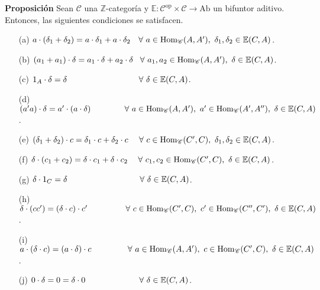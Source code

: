 \documentclass[preview]{standalone}
\begin{document}
\begin{center}
\justifying \textbf{Proposición} Sean $\mathscr{C}$ una $\mathbb{Z}$-categoría y $\mathbb{E}:\mathscr{C}^\text{op}\times\mathscr{C}\to\text{Ab}$ un bifuntor aditivo. Entonces, las siguientes condiciones se satisfacen. \begin{enumerate} \item[(a)] $a\cdot(\delta_1+\delta_2) = a\cdot\delta_1 + a\cdot\delta_2 \hspace{-0.1mm} \quad \forall \ a\in\text{Hom}_\mathscr{C}(A,A'), \ \delta_1,\delta_2\in\mathbb{E}(C,A)$. \item[(b)] $(a_1+a_1)\cdot\delta = a_1\cdot\delta + a_2\cdot\delta \quad \hspace{-0.58mm} \forall \ a_1,a_2\in\text{Hom}_\mathscr{C}(A,A'), \ \delta\in\mathbb{E}(C,A)$. \item[(c)] $1_A\cdot\delta = \delta \hspace{3.06cm} \forall \ \delta\in\mathbb{E}(C,A)$. \item[(d)] $(a'a)\cdot\delta = a'\cdot(a\cdot\delta) \hspace{1.455cm} \forall \ a\in\text{Hom}_\mathscr{C}(A,A'), \ a'\in\text{Hom}_\mathscr{C}(A',A''), \ \delta\in\mathbb{E}(C,A)$. \item[(e)] $(\delta_1+\delta_2)\cdot c = \delta_1\cdot c + \delta_2\cdot c \hspace{4.65mm} \forall \ c\in\text{Hom}_\mathscr{C}(C',C), \ \delta_1,\delta_2\in\mathbb{E}(C,A)$. \item[(f)] $\delta\cdot(c_1+c_2)=\delta\cdot c_1 + \delta\cdot c_2 \hspace{4.425mm} \forall \ c_1,c_2\in\text{Hom}_\mathscr{C}(C',C), \ \delta\in\mathbb{E}(C,A)$. \item[(g)] $\delta\cdot1_C  = \delta \hspace{3.085cm} \forall \ \delta\in\mathbb{E}(C,A)$. \item[(h)] $\delta\cdot(cc') = (\delta\cdot c)\cdot c' \hspace{1.65cm} \forall \ c\in\text{Hom}_\mathscr{C}(C',C), \ c'\in\text{Hom}_\mathscr{C}(C'',C'), \ \delta\in\mathbb{E}(C,A)$. \item[(i)] $a\cdot(\delta\cdot c) = (a\cdot\delta)\cdot c \hspace{1.55cm} \forall \ a\in\text{Hom}_\mathscr{C}(A,A'), \ c\in\text{Hom}_\mathscr{C}(C',C), \ \delta\in\mathbb{E}(C,A)$. \item[(j)] $0\cdot\delta = 0 = \delta\cdot0 \hspace{2.3cm} \forall \ \delta\in\mathbb{E}(C,A)$. \end{enumerate}
\end{center}
\end{document}

